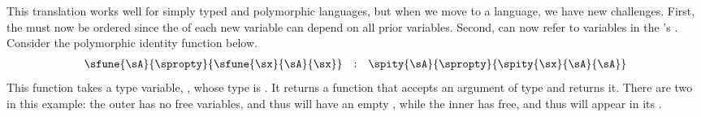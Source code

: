 This translation works well for simply typed and polymorphic languages, but when
we move to a  language, we have new challenges.
First, the  must now be ordered since the  of each
new variable can depend on all prior variables.
Second,  can now refer to variables in the 's
.
Consider the polymorphic identity function below.
%
\begin{displaymath}
  \begin{array}{rcl}
  \sfune{\sA}{\spropty}{\sfune{\sx}{\sA}{\sx}} & : & \spity{\sA}{\spropty}{\spity{\sx}{\sA}{\sA}}
  \end{array}
\end{displaymath}
%
This function takes a type variable, \im{\sA}, whose type is \im{\spropty}.
It returns a function that accepts an argument \im{\sx} of type \im{\sA} and returns it.
There are two  in this example: the outer  has no
free variables, and thus will have an empty , while the inner
 \im{\sfune{\sx}{\sA}{\sx}} has \im{\sA} free, and thus \im{\sA}
will appear in its .

